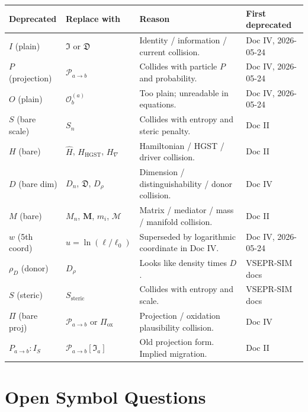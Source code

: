 \documentclass[11pt, a4paper, oneside]{article}
\begin{document}
\begin{longtable}{C{1.8cm} L{3.8cm} L{3.8cm} L{3.8cm}}
  \toprule
  \textbf{Deprecated} & \textbf{Replace with} & \textbf{Reason} & \textbf{First deprecated} \\
  \midrule
  \endhead
  $I$ (plain) & $\mathfrak{I}$ or $\mathfrak{D}$ &
    Identity / information / current collision. & Doc IV, 2026-05-24 \\[4pt]
  $P$ (projection) & $\mathcal{P}_{a \to b}$ &
    Collides with particle $P$ and probability. & Doc IV, 2026-05-24 \\[4pt]
  $O$ (plain) & $\mathcal{O}_b^{(a)}$ &
    Too plain; unreadable in equations. & Doc IV, 2026-05-24 \\[4pt]
  $S$ (bare scale) & $S_n$ &
    Collides with entropy and steric penalty. & Doc II \\[4pt]
  $H$ (bare) & $\hat{H}$, $H_{\mathrm{HGST}}$, $H_\nabla$ &
    Hamiltonian / HGST / driver collision. & Doc II \\[4pt]
  $D$ (bare dim) & $D_n$, $\mathfrak{D}$, $D_\rho$ &
    Dimension / distinguishability / donor collision. & Doc IV \\[4pt]
  $M$ (bare) & $M_n$, $\mathbf{M}$, $m_i$, $\mathcal{M}$ &
    Matrix / mediator / mass / manifold collision. & Doc II \\[4pt]
  $w$ (5th coord) & $u = \ln(\ell/\ell_0)$ &
    Superseded by logarithmic coordinate in Doc IV. & Doc IV, 2026-05-24 \\[4pt]
  $\rho_D$ (donor) & $D_\rho$ &
    Looks like density times $D$. & VSEPR-SIM docs \\[4pt]
  $S$ (steric) & $S_{\mathrm{steric}}$ &
    Collides with entropy and scale. & VSEPR-SIM docs \\[4pt]
  $\Pi$ (bare proj) & $\mathcal{P}_{a \to b}$ or $\Pi_{\mathrm{ox}}$ &
    Projection / oxidation plausibility collision. & Doc IV \\[4pt]
  $P_{a \to b} : I_S$ & $\mathcal{P}_{a \to b}[\mathfrak{I}_a]$ &
    Old projection form. Implied migration. & Doc II \\
  \bottomrule
\end{longtable}

\section{Open Symbol Questions}
\label{sec:open}
\end{document}
